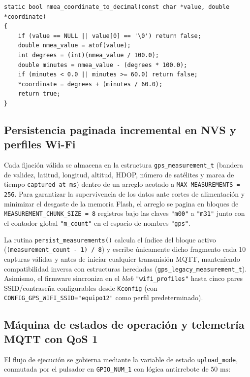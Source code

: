 \documentclass[12pt, letterpaper]{article}
\begin{document}
\begin{lstlisting}[style=cstyle, caption={Verificación de checksum XOR y conversión de coordenadas NMEA en \texttt{gps\_neo6m\_oled\_mqtt.c}.}, label={lst:nmea_parse}]
static bool nmea_coordinate_to_decimal(const char *value, double *coordinate)
{
    if (value == NULL || value[0] == '\0') return false;
    double nmea_value = atof(value);
    int degrees = (int)(nmea_value / 100.0);
    double minutes = nmea_value - (degrees * 100.0);
    if (minutes < 0.0 || minutes >= 60.0) return false;
    *coordinate = degrees + (minutes / 60.0);
    return true;
}
\end{lstlisting}

\subsection*{Persistencia paginada incremental en NVS y perfiles Wi-Fi}

Cada fijación válida se almacena en la estructura \texttt{gps\_measurement\_t} (bandera de validez, latitud, longitud, altitud, HDOP, número de satélites y marca de tiempo \texttt{captured\_at\_ms}) dentro de un arreglo acotado a \texttt{MAX\_MEASUREMENTS = 256}. Para garantizar la supervivencia de los datos ante cortes de alimentación y minimizar el desgaste de la memoria Flash, el arreglo se pagina en bloques de \texttt{MEASUREMENT\_CHUNK\_SIZE = 8} registros bajo las claves \texttt{"m00"} a \texttt{"m31"} junto con el contador global \texttt{"m\_count"} en el espacio de nombres \texttt{"gps"}.

La rutina \texttt{persist\_measurements()} calcula el índice del bloque activo (\texttt{(measurement\_count - 1) / 8}) y escribe únicamente dicho fragmento cada 10 capturas válidas y antes de iniciar cualquier transmisión MQTT, manteniendo compatibilidad inversa con estructuras heredadas (\texttt{gps\_legacy\_measurement\_t}). Asimismo, el firmware sincroniza en el \textit{blob} \texttt{"wifi\_profiles"} hasta cinco pares SSID/contraseña configurables desde \texttt{Kconfig} (con \texttt{CONFIG\_GPS\_WIFI\_SSID="equipo12"} como perfil predeterminado).

\subsection*{Máquina de estados de operación y telemetría MQTT con QoS 1}

El flujo de ejecución se gobierna mediante la variable de estado \texttt{upload\_mode}, conmutada por el pulsador en \texttt{GPIO\_NUM\_1} con lógica antirrebote de $50\text{ ms}$:
\end{document}
